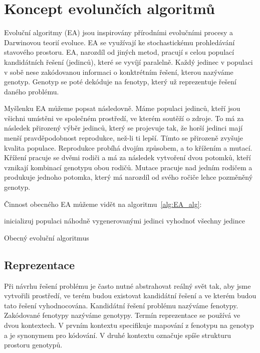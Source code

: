 \section{Koncept evolunčích algoritmů}

Evoluční algoritmy (EA) jsou inspirovány přírodními evolučními procesy a Darwinovou teorií evoluce.
EA se využívají ke stochastickému prohledávání stavového prostoru.
EA, narozdíl od jiných metod, pracují s celou populací kandidátních řešení (jedinců), které se vyvíjí paralelně.
Každý jedinec v populaci v sobě nese zakódovanou informaci o konktrétním řešení, kterou nazýváme genotyp.
Genotyp se poté dekóduje na fenotyp, který už reprezentuje řešení daného problému.

Myšlenku EA můžeme popsat následovně.
Máme populaci jedinců, kteří jsou všichni umístěni ve společném prostředí, ve kterém soutěží o zdroje.
To má za následek přirozený výběr jedinců, který se projevuje tak, že horší jedinci mají menší pravděpodobnost reprodukce, než-li ti lepší.
Tímto se přirozeně zvyšuje kvalita populace.
Reprodukce probíhá dvojím způsobem, a to křížením a mutací.
Křížení pracuje se dvěmi rodiči a má za následek vytvoření dvou potomků, kteří vznikají kombinací genotypu obou rodičů.
Mutace pracuje nad jedním rodičem a produkuje jednoho potomka, který má narozdíl od svého ročiče lehce pozměněný genotyp.

Činnost obecného EA můžeme vidět na algoritmu~\ref{alg:EA_alg}:


\begin{algorithm}[H]
    inicializuj populaci náhodně vygenerovanými jedinci\;
    vyhodnoť všechny jedince\;
    \caption{Obecný evoluční algoritmus}
    \label{alg:EA_alg}
\end{algorithm}

\subsection{Reprezentace}
Při návrhu řešení problému je často nutné abstrahovat reálný svět tak, aby jsme vytvořili prostředí, ve terém budou existovat kandidátní řešení a ve kterém budou tato řešení vyhodnocována.
Kandidátní řešení problému nazýváme fenotypy.
Zakódované fenotypy nazýváme genotypy.
Termín reprezentace se používá ve dvou kontextech.
V prvním kontextu specifikuje mapování z fenotypu na genotyp a je synonymem pro kódování.
V druhé kontextu označuje spíše strukturu prostoru genotypů.

